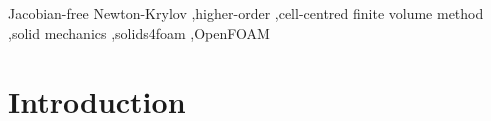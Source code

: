 \documentclass[review,3p]{elsarticle}
\begin{document}
\begin{frontmatter}
\begin{keyword}
Jacobian-free Newton-Krylov \sep higher-order \sep cell-centred finite volume method \sep solid mechanics \sep solids4foam \sep OpenFOAM
\end{keyword}


\end{frontmatter}

\linenumbers

\section{Introduction}\label{sec:intro}
%
%
%
%
%
\end{document}
